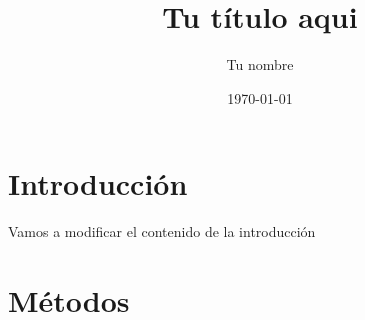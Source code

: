 \documentclass{article}
\title{Tu título aqui}
\author{Tu nombre}
\date{\today}
\begin{document}
\maketitle

\section{Introducción}


Vamos a modificar el contenido de la introducción

\section {Métodos}
\end{document}
